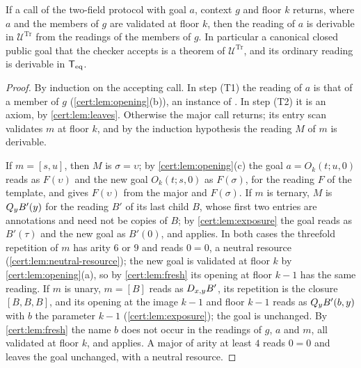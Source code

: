 \begin{theorem}\label{cert:thm:two-field-sound}
If a call of the two-field protocol with goal $a$, context $g$ and floor $k$
returns, where $a$ and the members of $g$ are validated at floor $k$, then
the reading of $a$ is derivable in $\mathcal U^{\mathrm{Tr}}$ from the
readings of the members of $g$. In particular a canonical closed public goal
that the checker accepts is a theorem of $\mathcal U^{\mathrm{Tr}}$, and its
ordinary reading is derivable in $\mathsf{T}_{\mathrm{eq}}$.
\end{theorem}
\begin{proof}
By induction on the accepting call. In step (T1) the reading of $a$ is that of
a member of $g$ (\cref{cert:lem:opening}(b)), an instance of .
In step (T2) it is an axiom, by \cref{cert:lem:leaves}. Otherwise the major
call returns; its entry scan validates $m$ at floor $k$, and by the induction
hypothesis the reading $M$ of $m$ is derivable.

If $m=[s,u]$, then $M$ is $\sigma=\upsilon$; by \cref{cert:lem:opening}(c)
the goal $a=O_k(t;u,0)$ reads as $F(\upsilon)$ and the new goal $O_k(t;s,0)$
as $F(\sigma)$, for the reading $F$ of the template, and  gives
$F(\upsilon)$ from the major and $F(\sigma)$. If $m$ is ternary, $M$ is
$Q_{y}B'(y)$ for the reading $B'$ of its last child $B$, whose first two
entries are annotations and need not be copies of $B$; by
\cref{cert:lem:exposure} the goal reads as $B'(\tau)$ and the new goal as
$B'(0)$, and  applies. In both cases the threefold repetition of
$m$ has arity $6$ or $9$ and reads $0=0$, a neutral resource
(\cref{cert:lem:neutral-resource}); the new goal is validated at floor $k$ by
\cref{cert:lem:opening}(a), so by \cref{cert:lem:fresh} its opening at floor
$k-1$ has the same reading. If $m$ is unary, $m=[B]$ reads as $D_{x,y}B'$,
its repetition is the closure $[B,B,B]$, and its opening at the image $k-1$
and floor $k-1$ reads as $Q_{y}B'(b,y)$ with $b$ the parameter $k-1$
(\cref{cert:lem:exposure}); the goal is unchanged. By \cref{cert:lem:fresh}
the name $b$ does not occur in the readings of $g$, $a$ and $m$, all
validated at floor $k$, and  applies. A major of arity at least
$4$ reads $0=0$ and leaves the goal unchanged, with a neutral resource.


\end{proof}
